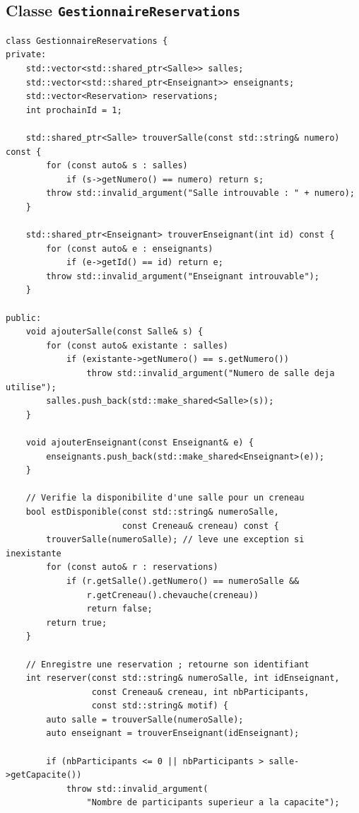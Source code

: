 \documentclass[12pt,a4paper]{report}
\begin{document}
\subsection{Classe \texttt{GestionnaireReservations}}
\begin{lstlisting}[style=cppstyle]
class GestionnaireReservations {
private:
    std::vector<std::shared_ptr<Salle>> salles;
    std::vector<std::shared_ptr<Enseignant>> enseignants;
    std::vector<Reservation> reservations;
    int prochainId = 1;

    std::shared_ptr<Salle> trouverSalle(const std::string& numero) const {
        for (const auto& s : salles)
            if (s->getNumero() == numero) return s;
        throw std::invalid_argument("Salle introuvable : " + numero);
    }

    std::shared_ptr<Enseignant> trouverEnseignant(int id) const {
        for (const auto& e : enseignants)
            if (e->getId() == id) return e;
        throw std::invalid_argument("Enseignant introuvable");
    }

public:
    void ajouterSalle(const Salle& s) {
        for (const auto& existante : salles)
            if (existante->getNumero() == s.getNumero())
                throw std::invalid_argument("Numero de salle deja utilise");
        salles.push_back(std::make_shared<Salle>(s));
    }

    void ajouterEnseignant(const Enseignant& e) {
        enseignants.push_back(std::make_shared<Enseignant>(e));
    }

    // Verifie la disponibilite d'une salle pour un creneau
    bool estDisponible(const std::string& numeroSalle,
                       const Creneau& creneau) const {
        trouverSalle(numeroSalle); // leve une exception si inexistante
        for (const auto& r : reservations)
            if (r.getSalle().getNumero() == numeroSalle &&
                r.getCreneau().chevauche(creneau))
                return false;
        return true;
    }

    // Enregistre une reservation ; retourne son identifiant
    int reserver(const std::string& numeroSalle, int idEnseignant,
                 const Creneau& creneau, int nbParticipants,
                 const std::string& motif) {
        auto salle = trouverSalle(numeroSalle);
        auto enseignant = trouverEnseignant(idEnseignant);

        if (nbParticipants <= 0 || nbParticipants > salle->getCapacite())
            throw std::invalid_argument(
                "Nombre de participants superieur a la capacite");


\end{lstlisting}
\end{document}
